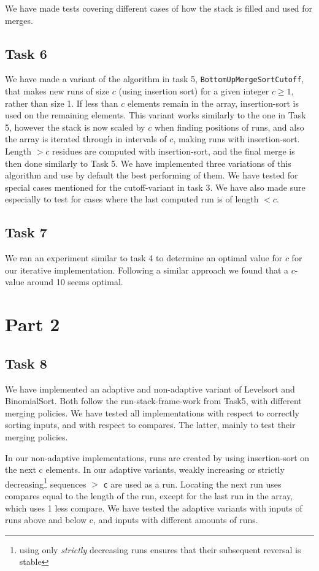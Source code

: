 \documentclass[11pt, a4paper]{article}
\begin{document}
 We have made tests covering different cases of how the stack is filled and used for merges.

\subsection{Task 6}

We have made a variant of the algorithm in task 5, \verb|BottomUpMergeSortCutoff|, that makes new runs of size $c$ (using insertion sort) for a given integer $c\geq1$, rather than size 1. If less than $c$ elements remain in the array, insertion-sort is used on the remaining elements. This variant works similarly to the one in Task 5, however the stack is now scaled by $c$ when finding positions of runs, and also the array is iterated through in intervals of $c$, making runs with insertion-sort. Length $>c$ residues are computed with insertion-sort, and the final merge is then done similarly to Task 5. We have implemented three variations of this algorithm and use by default the best performing of them. We have tested for special cases mentioned for the cutoff-variant in task 3. We have also made sure especially to test for cases where the last computed run is of length $<c$. 

\subsection{Task 7}

We ran an experiment similar to task 4 to determine an optimal value for $c$ for our iterative implementation. Following a similar approach we found that a $c$-value around 10 seems optimal.

\section{Part 2}

\subsection{Task 8}

We have implemented an adaptive and non-adaptive variant of Levelsort and BinomialSort. Both follow the run-stack-frame-work from Task5, with different merging policies. We have tested all implementations with respect to correctly sorting inputs, and with respect to compares. The latter, mainly to test their merging policies.

In our non-adaptive implementations, runs are created by using insertion-sort on the next c elements. In our adaptive variants, weakly increasing or strictly decreasing\footnote{using only \textit{strictly} decreasing runs ensures that their subsequent reversal is stable} sequences $>$ \verb|c| are used as a run. Locating the next run uses compares equal to the length of the run, except for the last run in the array, which uses 1 less compare. We have tested the adaptive variants with inputs of runs above and below c, and inputs with different amounts of runs.
\end{document}
